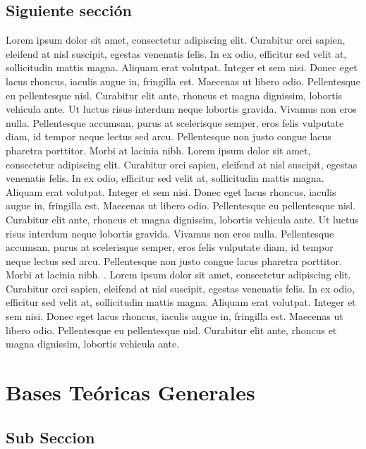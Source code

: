 \subsection{Siguiente sección}

Lorem ipsum dolor sit amet, consectetur adipiscing elit. Curabitur orci sapien, eleifend at nisl suscipit, egestas venenatis felis. In ex odio, efficitur sed velit at, sollicitudin mattis magna. Aliquam erat volutpat. Integer et sem nisi. Donec eget lacus rhoncus, iaculis augue in, fringilla est. Maecenas ut libero odio. Pellentesque eu pellentesque nisl. Curabitur elit ante, rhoncus et magna dignissim, lobortis vehicula ante. Ut luctus risus interdum neque lobortis gravida. Vivamus non eros nulla. Pellentesque accumsan, purus at scelerisque semper, eros felis vulputate diam, id tempor neque lectus sed arcu. Pellentesque non justo congue lacus pharetra porttitor. Morbi at lacinia nibh. \citep{GRADE1990} Lorem ipsum dolor sit amet, consectetur adipiscing elit. Curabitur orci sapien, eleifend at nisl suscipit, egestas venenatis felis. In ex odio, efficitur sed velit at, sollicitudin mattis magna. Aliquam erat volutpat. Integer et sem nisi. Donec eget lacus rhoncus, iaculis augue in, fringilla est. Maecenas ut libero odio. Pellentesque eu pellentesque nisl. Curabitur elit ante, rhoncus et magna dignissim, lobortis vehicula ante. Ut luctus risus interdum neque lobortis gravida. Vivamus non eros nulla. Pellentesque accumsan, purus at scelerisque semper, eros felis vulputate diam, id tempor neque lectus sed arcu. Pellentesque non justo congue lacus pharetra porttitor. Morbi at lacinia nibh. \citep{Yamada2014}. Lorem ipsum dolor sit amet, consectetur adipiscing elit. Curabitur orci sapien, eleifend at nisl suscipit, egestas venenatis felis. In ex odio, efficitur sed velit at, sollicitudin mattis magna. Aliquam erat volutpat. Integer et sem nisi. Donec eget lacus rhoncus, iaculis augue in, fringilla est. Maecenas ut libero odio. Pellentesque eu pellentesque nisl. Curabitur elit ante, rhoncus et magna dignissim, lobortis vehicula ante.


\newpage

\section{Bases Teóricas Generales}


\subsection{Sub Seccion}



